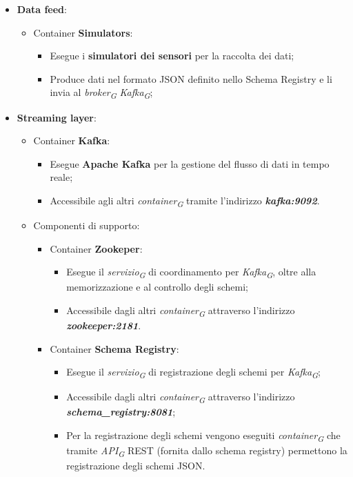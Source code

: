 \begin{itemize}
    \item \textbf{Data feed}:
    \begin{itemize}
        \item Container \textbf{Simulators}: 
        \begin{itemize}
            \item Esegue i \textbf{simulatori dei sensori} per la raccolta dei dati;
            \item Produce dati nel formato JSON definito nello Schema Registry e li invia al \textit{broker}\textsubscript{\textit{G}} \textit{Kafka}\textsubscript{\textit{G}};
        \end{itemize}
    \end{itemize} 
    \item \textbf{Streaming layer}:
    \begin{itemize}
        \item Container \textbf{Kafka}:  
        \begin{itemize}
            \item Esegue \textbf{Apache Kafka} per la gestione del flusso di dati in tempo reale;
            \item Accessibile agli altri \textit{container}\textsubscript{\textit{G}} tramite l'indirizzo \textit{\textbf{kafka:9092}}.
        \end{itemize}
        \item Componenti di supporto:
       \begin{itemize}
        \item Container \textbf{Zookeper}:
        \begin{itemize}
            \item Esegue il \textit{servizio}\textsubscript{\textit{G}} di coordinamento per \textit{Kafka}\textsubscript{\textit{G}}, oltre alla memorizzazione e al controllo degli schemi;
            \item Accessibile dagli altri \textit{container}\textsubscript{\textit{G}} attraverso l’indirizzo \textit{\textbf{zookeeper:2181}}.
        \end{itemize}
        \item Container \textbf{Schema Registry}:
        \begin{itemize}
            \item Esegue il \textit{servizio}\textsubscript{\textit{G}} di registrazione degli schemi per \textit{Kafka}\textsubscript{\textit{G}};
            \item Accessibile dagli altri \textit{container}\textsubscript{\textit{G}} attraverso l’indirizzo \textit{\textbf{schema\_registry:8081}};
            \item Per la registrazione degli schemi vengono eseguiti \textit{container}\textsubscript{\textit{G}} che tramite \textit{API}\textsubscript{\textit{G}} REST (fornita dallo schema registry) permettono la registrazione degli schemi JSON.
        \end{itemize}
       \end{itemize}
        

\end{itemize}
\end{itemize}
